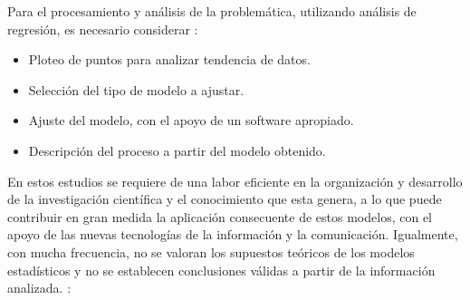 Para el procesamiento y análisis de la problemática, utilizando análisis de regresión, es necesario considerar \parencite{fernandez2003biomodelos, rodriguez2018aplicaciones}:
\begin{itemize}
	\item Ploteo de puntos para analizar tendencia de datos.
	\item Selección del tipo de modelo a ajustar.
	\item Ajuste del modelo, con el apoyo de un software apropiado.
	\item Descripción del proceso a partir del modelo obtenido.
\end{itemize}

En estos estudios se requiere de una labor eficiente en la organización y desarrollo de la investigación científica y el conocimiento que esta genera, a lo que puede contribuir en gran medida la aplicación consecuente de estos modelos, con el apoyo de las nuevas tecnologías de la información y la comunicación. Igualmente, con mucha frecuencia, no se valoran los supuestos teóricos de los modelos estadísticos y no se establecen conclusiones válidas a partir de la información analizada. \parencite{guerra2003criterios}:
